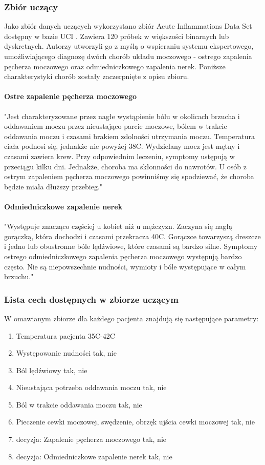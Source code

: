 \documentclass[12pt]{article}
\begin{document}
\subsubsection{Zbiór uczący}
Jako zbiór danych uczących wykorzystano zbiór Acute Inflammations Data Set dostępny w bazie UCI \cite{dataset}. Zawiera 120 próbek w większości binarnych lub dyskretnych. Autorzy utworzyli go z myślą o wspieraniu systemu ekspertowego, umożliwiającego diagnozę dwóch chorób układu moczowego - ostrego zapalenia pęcherza moczowego oraz odmiedniczkowego zapalenia nerek. Poniższe charakterystyki chorób zostały zaczerpnięte z opisu zbioru.

\paragraph{Ostre zapalenie pęcherza moczowego}
"Jest charakteryzowane przez nagłe wystąpienie bólu w okolicach brzucha i oddawaniem moczu przez nieustająco parcie moczowe, bólem w trakcie oddawania moczu i czasami brakiem zdolności utrzymania moczu. Temperatura ciała podnosi się, jednakże nie powyżej 38C. Wydzielany mocz jest mętny i czasami zawiera krew. Przy odpowiednim leczeniu, symptomy ustępują w przeciągu kilku dni. Jednakże, choroba ma skłonności do nawrotów. U osób z ostrym zapaleniem pęcherza moczowego powinniśmy się spodziewać, że choroba będzie miała dłuższy przebieg."

\paragraph{Odmiedniczkowe zapalenie nerek}
"Występuje znacząco częściej u kobiet niż u mężczyzn. Zaczyna się nagłą gorączką, która dochodzi i czasami przekracza 40C. Gorączce towarzyszą dreszcze i jedno lub obustronne bóle lędźwiowe, które czasami są bardzo silne. Symptomy ostrego odmiedniczkowego zapalenia pęcherza moczowego występują bardzo często. Nie są niepowszechnie nudności, wymioty i bóle występujące w całym brzuchu."

\subsubsection{Lista cech dostępnych w zbiorze uczącym}

W omawianym zbiorze dla każdego pacjenta znajdują się następujące parametry:

\begin{enumerate}
	\item Temperatura pacjenta 35C-42C
	\item Występowanie nudności tak, nie
	\item Ból lędźwiowy tak, nie
	\item Nieustająca potrzeba oddawania moczu tak, nie
	\item Ból w trakcie oddawania moczu tak, nie
	\item Pieczenie cewki moczowej, swędzenie, obrzęk ujścia cewki moczowej tak, nie
	\item decyzja: Zapalenie pęcherza moczowego tak, nie
	\item decyzja: Odmiedniczkowe zapalenie nerek tak, nie
\end{enumerate}
\end{document}
